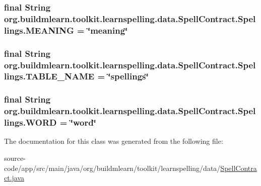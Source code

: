\subsubsection[{\texorpdfstring{M\+E\+A\+N\+I\+NG}{MEANING}}]{\setlength{\rightskip}{0pt plus 5cm}final String org.\+buildmlearn.\+toolkit.\+learnspelling.\+data.\+Spell\+Contract.\+Spellings.\+M\+E\+A\+N\+I\+NG = \char`\"{}meaning\char`\"{}\hspace{0.3cm}{\ttfamily [static]}}\hypertarget{classorg_1_1buildmlearn_1_1toolkit_1_1learnspelling_1_1data_1_1SpellContract_1_1Spellings_ab23d71c57f617273f1914bc8bfa25e6a}{}\label{classorg_1_1buildmlearn_1_1toolkit_1_1learnspelling_1_1data_1_1SpellContract_1_1Spellings_ab23d71c57f617273f1914bc8bfa25e6a}
\subsubsection[{\texorpdfstring{T\+A\+B\+L\+E\+\_\+\+N\+A\+ME}{TABLE_NAME}}]{\setlength{\rightskip}{0pt plus 5cm}final String org.\+buildmlearn.\+toolkit.\+learnspelling.\+data.\+Spell\+Contract.\+Spellings.\+T\+A\+B\+L\+E\+\_\+\+N\+A\+ME = \char`\"{}spellings\char`\"{}\hspace{0.3cm}{\ttfamily [static]}}\hypertarget{classorg_1_1buildmlearn_1_1toolkit_1_1learnspelling_1_1data_1_1SpellContract_1_1Spellings_ae800fd714d5ea80de21c807c9b93d2be}{}\label{classorg_1_1buildmlearn_1_1toolkit_1_1learnspelling_1_1data_1_1SpellContract_1_1Spellings_ae800fd714d5ea80de21c807c9b93d2be}
\subsubsection[{\texorpdfstring{W\+O\+RD}{WORD}}]{\setlength{\rightskip}{0pt plus 5cm}final String org.\+buildmlearn.\+toolkit.\+learnspelling.\+data.\+Spell\+Contract.\+Spellings.\+W\+O\+RD = \char`\"{}word\char`\"{}\hspace{0.3cm}{\ttfamily [static]}}\hypertarget{classorg_1_1buildmlearn_1_1toolkit_1_1learnspelling_1_1data_1_1SpellContract_1_1Spellings_ac2a3d72883e5931f0fea06f44698fb92}{}\label{classorg_1_1buildmlearn_1_1toolkit_1_1learnspelling_1_1data_1_1SpellContract_1_1Spellings_ac2a3d72883e5931f0fea06f44698fb92}


The documentation for this class was generated from the following file\+:\begin{DoxyCompactItemize}
\item 
source-\/code/app/src/main/java/org/buildmlearn/toolkit/learnspelling/data/\hyperlink{SpellContract_8java}{Spell\+Contract.\+java}\end{DoxyCompactItemize}
